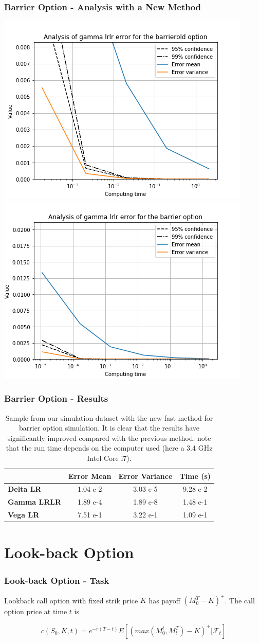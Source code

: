 \documentclass[12pt]{beamer}
\begin{document}
\begin{frame}
\frametitle{Barrier Option - Analysis with a New Method}
\includegraphics[width=.5\textwidth]{graphs/barrieroldgammalrlrtime.png}
\includegraphics[width=.5\textwidth]{graphs/barriergammalrlrtime.png}
\end{frame}

\begin{frame}
\frametitle{Barrier Option - Results}
\begin{table}
\centering
\begin{tabular}{|l|c|c|c|}
\hline
    & \textbf{Error Mean} & \textbf{Error Variance} & \textbf{Time (s)} \\ \hline
\textbf{Delta LR} & 1.04 e-2 & 3.03 e-5 & 9.28 e-2\\ \hline
\textbf{Gamma LRLR} & 1.89 e-4 & 1.89 e-8& 1.48 e-1\\ \hline
\textbf{Vega LR} & 7.51 e-1 & 3.22 e-1 & 1.09 e-1\\ \hline
\end{tabular}
\caption{Sample from our simulation dataset with the new fast method for barrier option simulation. It is clear that the results have significantly improved compared with the previous method. note that the run time depends on the computer used (here a 3.4 GHz Intel Core i7).}
\end{table}

\end{frame}


\section{Look-back Option}
\frame{\tableofcontents[currentsection]}
\begin{frame}
\frametitle{Look-back Option - Task}
Lookback call option with fixed strik price $K$ has payoff $(M^T_{0}-K)^+$. The call option price at time $t$ is

$$c(S_0,K,t) = e^{-r(T-t)}E[(max(M^t_0,M^T_t)-K)^+|\mathcal{F}_t] $$


\end{frame}
\end{document}
